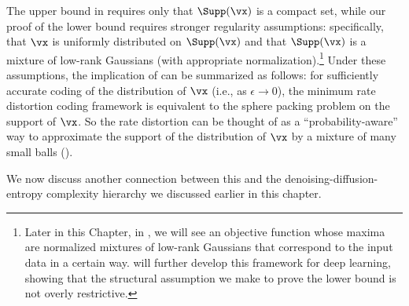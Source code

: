 \documentclass[../../book-main.tex]{subfiles}
\begin{document}
The upper bound in  requires only that
$\Supp(\vx)$ is a compact set, while our proof of the lower bound requires
stronger regularity assumptions: specifically, that $\vx$ is uniformly
distributed on $\Supp(\vx)$ and that $\Supp(\vx)$ is a mixture of
low-rank Gaussians (with appropriate normalization).\footnote{Later in this Chapter, in , we
will see an objective function whose maxima are normalized mixtures of low-rank
Gaussians that correspond to the input data in a certain way.
 will further develop this framework for deep learning,
showing that the structural assumption we make to prove the lower bound is
not overly restrictive.}
Under these assumptions, the implication of
 can be summarized as follows: for
sufficiently accurate coding of the distribution of
$\vx$ (i.e., as $\epsilon \to 0$), the minimum rate distortion coding framework
is equivalent to
the sphere packing problem on the support of $\vx$.
So the rate distortion can be thought of as a ``probability-aware'' way to
approximate the support of the distribution of
\(\vx\) by a mixture of many small balls ().

We now discuss another connection between this and the
denoising-diffusion-entropy complexity hierarchy we discussed earlier in this
chapter.
\end{document}
